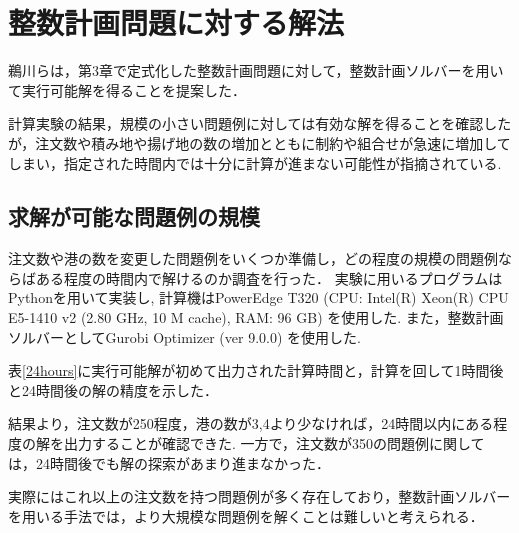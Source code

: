 \chapter{整数計画問題に対する解法}\label{method1}

\label {gurobiの計算実験}
鵜川ら\cite{ukawa}は，第3章で定式化した整数計画問題に対して，整数計画ソルバーを用いて実行可能解を得ることを提案した．

計算実験の結果，規模の小さい問題例に対しては有効な解を得ることを確認したが，注文数や積み地や揚げ地の数の増加とともに制約や組合せが急速に増加してしまい，指定された時間内では十分に計算が進まない可能性が指摘されている.

\section{求解が可能な問題例の規模}
\label{mip}
注文数や港の数を変更した問題例をいくつか準備し，どの程度の規模の問題例ならばある程度の時間内で解けるのか調査を行った．
実験に用いるプログラムは Pythonを用いて実装し, 計算機はPowerEdge T320 (CPU: Intel(R) Xeon(R) CPU E5-1410 v2 (2.80 GHz, 10 M cache), RAM: 96 GB) を使用した. また，整数計画ソルバーとしてGurobi Optimizer (ver 9.0.0) を使用した.

表\ref{24hours}に実行可能解が初めて出力された計算時間と，計算を回して1時間後と24時間後の解の精度を示した．

結果より，注文数が250程度，港の数が3,4より少なければ，24時間以内にある程度の解を出力することが確認できた.
一方で，注文数が350の問題例に関しては，24時間後でも解の探索があまり進まなかった．

実際にはこれ以上の注文数を持つ問題例が多く存在しており，整数計画ソルバーを用いる手法では，より大規模な問題例を解くことは難しいと考えられる．

